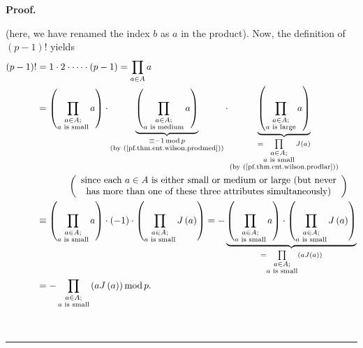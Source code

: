 \documentclass[numbers=enddot,12pt,final,onecolumn,notitlepage]{scrartcl}%
\numberwithin{exer}{subsection}
\theoremstyle{definition}
\newenvironment{fineprint}{\begin{small}}{\end{small}}
\newenvironment{proof}[1][Proof]{\noindent\textbf{#1.} }{\ \rule{0.5em}{0.5em}}
\let\prodnonlimits\prod
\renewcommand{\prod}{\prodnonlimits\limits}
\begin{document}
\begin{proof}
\begin{fineprint}
\begin{equation}
\end{equation}
(here, we have renamed the index $b$ as $a$ in the product). Now, the
definition of $\left(  p-1\right)  !$ yields%
\begin{align}
\left(  p-1\right)  !  &  =1\cdot2\cdot\cdots\cdot\left(  p-1\right)
=\prod_{a\in A}a\nonumber\\
&  =\left(  \prod_{\substack{a\in A;\\a\text{ is small}}}a\right)
\cdot\underbrace{\left(  \prod_{\substack{a\in A;\\a\text{ is medium}%
}}a\right)  }_{\substack{\equiv-1\operatorname{mod}p\\\text{(by
(\ref{pf.thm.ent.wilson.prodmed}))}}}\cdot\underbrace{\left(  \prod
_{\substack{a\in A;\\a\text{ is large}}}a\right)  }_{\substack{=\prod
_{\substack{a\in A;\\a\text{ is small}}}J\left(  a\right)  \\\text{(by
(\ref{pf.thm.ent.wilson.prodlar}))}}}\nonumber\\
&  \ \ \ \ \ \ \ \ \ \ \left(
\begin{array}
[c]{c}%
\text{since each }a\in A\text{ is either small or medium or large (but
never}\\
\text{has more than one of these three attributes simultaneously)}%
\end{array}
\right) \nonumber\\
&  \equiv\left(  \prod_{\substack{a\in A;\\a\text{ is small}}}a\right)
\cdot\left(  -1\right)  \cdot\left(  \prod_{\substack{a\in A;\\a\text{ is
small}}}J\left(  a\right)  \right)  =-\underbrace{\left(  \prod
_{\substack{a\in A;\\a\text{ is small}}}a\right)  \cdot\left(  \prod
_{\substack{a\in A;\\a\text{ is small}}}J\left(  a\right)  \right)  }%
_{=\prod_{\substack{a\in A;\\a\text{ is small}}}\left(  aJ\left(  a\right)
\right)  }\nonumber\\
&  =-\prod_{\substack{a\in A;\\a\text{ is small}}}\left(  aJ\left(  a\right)
\right)  \operatorname{mod}p. \label{pf.thm.ent.wilson.6}%
\end{align}



\end{fineprint}
\end{proof}
\end{document}
